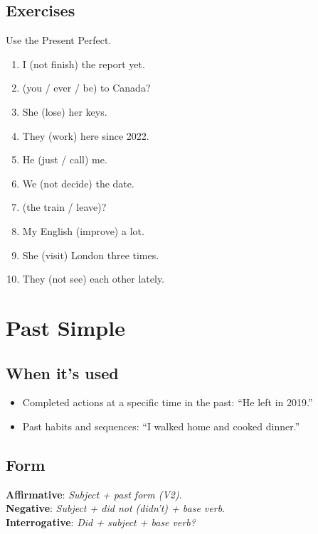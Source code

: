 \documentclass[11pt,a4paper]{article}
\begin{document}
\subsection*{Exercises}
Use the Present Perfect.
\begin{enumerate}
  \item I \underline{\hspace{2.5cm}} (not finish) the report yet.
  \item \underline{\hspace{2.5cm}} (you / ever / be) to Canada?
  \item She \underline{\hspace{2.5cm}} (lose) her keys.
  \item They \underline{\hspace{2.5cm}} (work) here since 2022.
  \item He \underline{\hspace{2.5cm}} (just / call) me.
  \item We \underline{\hspace{2.5cm}} (not decide) the date.
  \item \underline{\hspace{2.5cm}} (the train / leave)?
  \item My English \underline{\hspace{2.5cm}} (improve) a lot.
  \item She \underline{\hspace{2.5cm}} (visit) London three times.
  \item They \underline{\hspace{2.5cm}} (not see) each other lately.
\end{enumerate}

\section{Past Simple}
\subsection*{When it’s used}
\begin{itemize}
  \item Completed actions at a specific time in the past: ``He left in 2019.''
  \item Past habits and sequences: ``I walked home and cooked dinner.''
\end{itemize}

\subsection*{Form}
\textbf{Affirmative}: \emph{Subject + past form (V2)}.\\
\textbf{Negative}: \emph{Subject + did not (didn’t) + base verb}.\\
\textbf{Interrogative}: \emph{Did + subject + base verb?}
\end{document}

